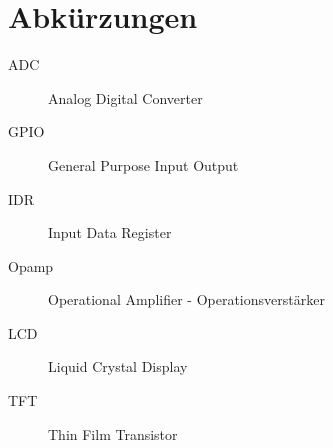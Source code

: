 \documentclass[a4paper,11pt,titlepage]{article}
\begin{document}


\tableofcontents
\thispagestyle{empty}
\clearpage

\setcounter{page}{3}
\section*{Abkürzungen}
\begin{description}
	\item[ADC]
	Analog Digital Converter
	
	\item[GPIO]
	General Purpose Input Output

	\item[IDR]
	Input Data Register
	
	\item[Opamp]
	Operational Amplifier - Operationsverstärker

	\item[LCD]
	Liquid Crystal Display

	\item[TFT]
	Thin Film Transistor
\end{description}
\clearpage

\setcounter{page}{1}





















\end{document}
